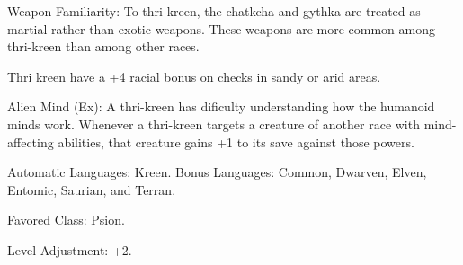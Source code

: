 \begin{itemize*}
    \item Weapon Familiarity: To thri-kreen, the chatkcha and gythka are treated as martial rather than exotic weapons. These weapons are more common among thri-kreen than among other races.
    \item Thri kreen have a +4 racial bonus on  checks in sandy or arid areas.
    \item Alien Mind (Ex): A thri-kreen has dificulty understanding how the humanoid minds work. Whenever a thri-kreen targets a creature of another race with mind-affecting abilities, that creature gains +1 to its save against those powers.
    \item Automatic Languages: Kreen. Bonus Languages: Common, Dwarven, Elven, Entomic, Saurian, and Terran.
    \item Favored Class: Psion.
    \item Level Adjustment: +2.
\end{itemize*}
